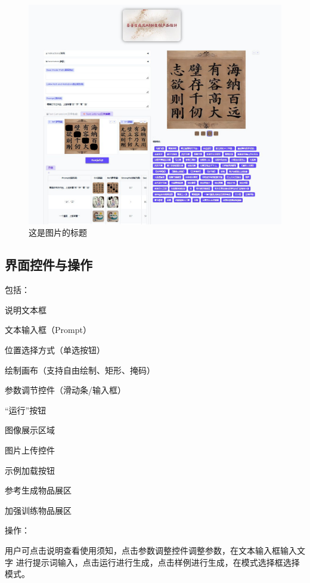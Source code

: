 \documentclass[a4paper,12pt]{article}
\begin{document}
\begin{figure}[htbp] %
    \centering %
    \includegraphics[width=1\textwidth]{Image/UI_2.png} %
    \caption{这是图片的标题} %
    \label{fig:logo} %
\end{figure}

\subsection{界面控件与操作}
\noindent 包括：

说明文本框

文本输入框（Prompt）

位置选择方式（单选按钮）

绘制画布（支持自由绘制、矩形、掩码）

参数调节控件（滑动条/输入框）

“运行”按钮

图像展示区域

图片上传控件

示例加载按钮

参考生成物品展区

加强训练物品展区

\noindent 操作：

用户可点击说明查看使用须知，点击参数调整控件调整参数，在文本输入框输入文字
进行提示词输入，点击运行进行生成，点击样例进行生成，在模式选择框选择模式。
\end{document}
